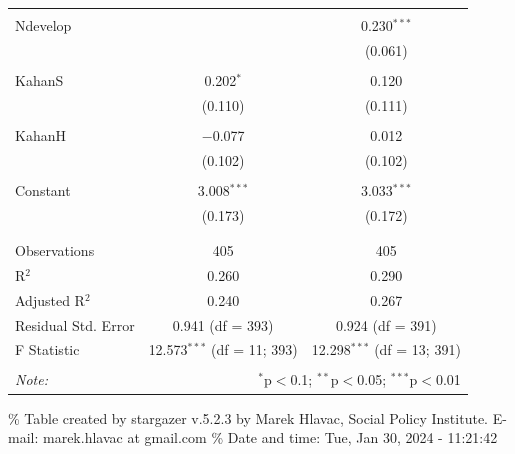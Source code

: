 \documentclass[
]{article}
\begin{document}
\begin{table}[!htbp]
\begin{tabular}{@{\extracolsep{5pt}}lcc}
  & & \\ 
 Ndevelop &  & 0.230$^{***}$ \\ 
  &  & (0.061) \\ 
  & & \\ 
 KahanS & 0.202$^{*}$ & 0.120 \\ 
  & (0.110) & (0.111) \\ 
  & & \\ 
 KahanH & $-$0.077 & 0.012 \\ 
  & (0.102) & (0.102) \\ 
  & & \\ 
 Constant & 3.008$^{***}$ & 3.033$^{***}$ \\ 
  & (0.173) & (0.172) \\ 
  & & \\ 
\hline \\[-1.8ex] 
Observations & 405 & 405 \\ 
R$^{2}$ & 0.260 & 0.290 \\ 
Adjusted R$^{2}$ & 0.240 & 0.267 \\ 
Residual Std. Error & 0.941 (df = 393) & 0.924 (df = 391) \\ 
F Statistic & 12.573$^{***}$ (df = 11; 393) & 12.298$^{***}$ (df = 13; 391) \\ 
\hline 
\hline \\[-1.8ex] 
\textit{Note:}  & \multicolumn{2}{r}{$^{*}$p$<$0.1; $^{**}$p$<$0.05; $^{***}$p$<$0.01} \\ 
\end{tabular} 
\end{table} 
\endgroup

\begingroup\setlength{\tabcolsep}{1pt}

\renewcommand{\arraystretch}{0.7}

\% Table created by stargazer v.5.2.3 by Marek Hlavac, Social Policy
Institute. E-mail: marek.hlavac at gmail.com \% Date and time: Tue, Jan
30, 2024 - 11:21:42
\end{document}
